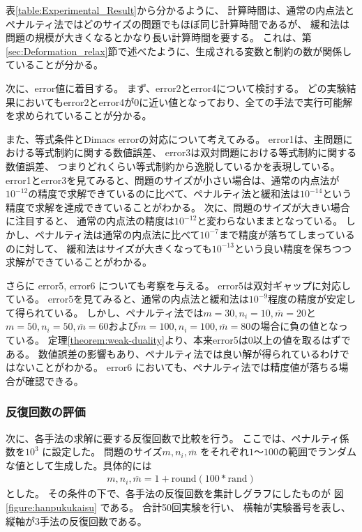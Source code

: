 \documentclass[11pt,a4paper,dvipdfmx,titlepage,uplatex]{jsarticle}
\theoremstyle{mystyle}
\newcommand{\0}{\mathbf{0}}
\begin{document}
表\ref{table:Experimental_Result}から分かるように、
計算時間は、通常の内点法とペナルティ法ではどのサイズの問題でもほぼ同じ計算時間であるが、
緩和法は問題の規模が大きくなるとかなり長い計算時間を要する。
これは、第\ref{sec:Deformation_relax}節で述べたように、生成される変数と制約の数が関係していることが分かる。

次に、error値に着目する。
まず、error2とerror4について検討する。
どの実験結果においてもerror2とerror4が$0$に近い値となっており、全ての手法で実行可能解を求められていることが分かる。

また、等式条件とDimacs errorの対応について考えてみる。
error1は、主問題における等式制約に関する数値誤差、
error3は双対問題における等式制約に関する数値誤差、
つまりどれくらい等式制約から逸脱しているかを表現している。
error1とerror3を見てみると、問題のサイズが小さい場合は、通常の内点法が$10^{-12}$の精度で求解できているのに比べて、ペナルティ法と緩和法は$10^{-14}$という精度で求解を達成できていることがわかる。
次に、問題のサイズが大きい場合に注目すると、
通常の内点法の精度は$10^{-12}$と変わらないままとなっている。
しかし、ペナルティ法は通常の内点法に比べて$10^{-7}$まで精度が落ちてしまっているのに対して、
緩和法はサイズが大きくなっても$10^{-13}$という良い精度を保ちつつ求解ができていることがわかる。

さらに error5, error6 についても考察を与える。
error5は双対ギャップに対応している。
error5を見てみると、通常の内点法と緩和法は$10^{-9}$程度の精度が安定して得られている。
しかし、ペナルティ法では$m = 30,n_i = 10,\overline{m} = 20$と$m = 50,n_i = 50,\overline{m} = 60$および$m = 100,n_i = 100,\overline{m} = 80$の場合に負の値となっている。
定理\ref{theorem:weak-duality}より、本来error5は$0$以上の値を取るはずである。
数値誤差の影響もあり、ペナルティ法では良い解が得られているわけではないことがわかる。
error6 においても、ペナルティ法では精度値が落ちる場合が確認できる。

\subsubsection{反復回数の評価}\label{sec:Evaluation_itertimes}

次に、各手法の求解に要する反復回数で比較を行う。
ここでは、ペナルティ係数を$10^3$ に設定した。
問題のサイズ$m,n_i,\overline{m}$
をそれぞれ$1$〜$100$の範囲でランダムな値として生成した。具体的には
\begin{align}
  m,n_i,\overline{m} = 1 + \text{round}(100*\text{rand})
\end{align}
とした。
その条件の下で、各手法の反復回数を集計しグラフにしたものが
図\ref{figure:hanpukukaisu}
である。
合計50回実験を行い、
横軸が実験番号を表し、縦軸が3手法の反復回数である。
\end{document}
